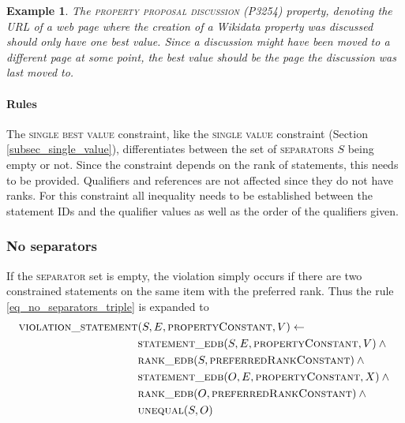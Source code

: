 \documentclass[hyperref,bachelorofscience,fleqn]{cgvpub}
\newtheorem{example}{Example}
\begin{document}
\begin{example}
The \textsc{property proposal discussion} (P3254) property, denoting the URL of a web page where the creation of a Wikidata property was discussed should only have one best value. Since a discussion might have been moved to a different page at some point, the best value should be the page the discussion was last moved to.
\end{example}

\paragraph{Rules}
The \textsc{single best value} constraint, like the \textsc{single value} constraint (Section \ref{subsec_single_value}), differentiates between the set of \textsc{separators} \(S\) being empty or not. Since the constraint depends on the rank of statements, this needs to be provided. Qualifiers and references are not affected since they do not have ranks. For this constraint all inequality needs to be established between the statement IDs and the qualifier values as well as the order of the qualifiers given.\\

\subsubsection{No separators}
If the \textsc{separator} set is empty, the violation simply occurs if there are two constrained statements on the same item with the preferred rank. Thus the rule \eqref{eq_no_separators_triple} is expanded to
\begin{align}
\begin{split}
\textsc{violation\_statement}&(S, E, \textsc{propertyConstant}, V) \leftarrow \\
&\textsc{statement\_edb}(S, E, \textsc{propertyConstant}, V) \wedge{} \\
&\textsc{rank\_edb}(S, \textsc{preferredRankConstant}) \wedge{} \\
&\textsc{statement\_edb}(O, E, \textsc{propertyConstant}, X) \wedge{} \\
&\textsc{rank\_edb}(O, \textsc{preferredRankConstant}) \wedge{} \\
&\textsc{unequal}(S, O)
\end{split}
\end{align}
\end{document}
